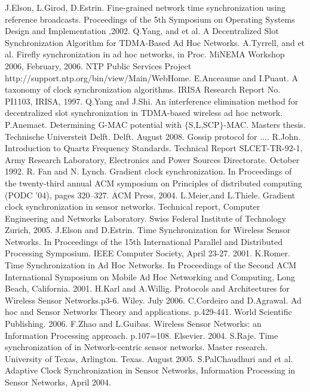 \documentclass[a4paper,10pt]{report}
\begin{document}
\begin{thebibliography}{\textbf{References}}
J.Elson, L.Girod, D.Estrin. Fine-grained network time synchronization using reference broadcasts. Proceedings of the 5th Symposium on Operating Systems Design and Implementation ,2002.
Q.Yang, and et al. A Decentralized Slot Synchronization Algorithm for TDMA-Based Ad Hoc Networks.
A.Tyrrell, and et al. Firefly synchronization in ad hoc networks, in Proc. MiNEMA Workshop 2006, February, 2006.
NTP Public Services Project http://support.ntp.org/bin/view/Main/WebHome.
E.Anceaume and I.Puaut. A taxonomy of clock synchronization algorithms. IRISA Research Report No. PI1103, IRISA, 1997.
Q.Yang and J.Shi. An interference elimination method for decentralized slot synchronization in TDMA-based wireless ad hoc network.
 P.Anemaet. Determining G-MAC potential with $\{$S,L,SCP$\}$-MAC. Masters thesis. Technische Universteit Delft. Delft. August 2008.
Gossip protocol for ....
R.John. Introduction to Quartz Frequency Standards. Technical Report SLCET-TR-92-1, Army Research Laboratory, Electronics and Power Sources Directorate. October 1992.
R. Fan and N. Lynch. Gradient clock synchronization. In Proceedings of the twenty-third annual ACM symposium on Principles of distributed computing (PODC ’04), pages 320–327. ACM Press, 2004.
L.Meier,and L.Thiele. Gradient clock synchronization in sensor networks. Technical report, Computer Engineering and Networks Laboratory. Swiss Federal Institute of Technology Zurich, 2005.
J.Elson and D.Estrin. Time Synchronization for Wireless Sensor Networks. In Proceedings of the 15th International Parallel and Distributed Processing Symposium. IEEE Computer Society, April 23-27. 2001.
K.Romer. Time Synchronization in Ad Hoc Networks. In Proceedings of the Second ACM International Symposium on Mobile Ad Hoc Networking and Computing, Long Beach, California. 2001.
H.Karl and A.Willig. Protocols and Architectures for Wireless Sensor Networks.p3-6. Wiley. July 2006.
C.Cordeiro and D.Agrawal. Ad hoc and Sensor Networks Theory and applications. p.429-441. World Scientific Publishing. 2006.
F.Zhao and  L.Guibas. Wireless Sensor Networks: an Information Processing approach. p.107=108. Elsevier. 2004.
 S.Raje. Time synchronization of in Network-centric sensor networks. Master research. University of Texas, Arlington. Texas. August 2005.
S.PalChaudhuri and et al. Adaptive Clock Synchronization in Sensor Networks, Information Processing in Sensor Networks, April 2004.

\end{thebibliography}
\end{document}
